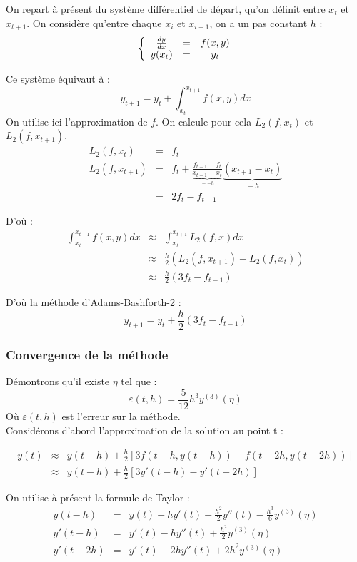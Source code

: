 \bigskip
On repart à présent du système différentiel de départ, qu'on définit entre $x_t$ et $x_{t+1}$. On considère qu'entre chaque $x_i$ et $x_{i+1}$, on a un pas constant $h$ :
\[ \left\{ \begin{array}{c c c}
	\frac{dy}{dx} &=& f(x,y) \\
		y(x_t)&=&y_t
\end{array}\right.\]

Ce système équivaut à : 
\[y_{t+1}=y_t + \int_{x_t}^{x_{t+1}} f(x,y) dx\]
On utilise ici l'approximation de $f$. On calcule pour cela $L_2(f,x_t)$ et $L_2(f,x_{t+1})$.
\begin{eqnarray*}
	L_2(f,x_t)&=&f_t\\
	L_2(f,x_{t+1})&=&f_t + \frac{f_{t-1}-f_t}{\underbrace{x_{t-1}-x_t}_{=-h}}\underbrace{(x_{t+1}-x_t)}_{=h}\\
			&=&2f_t - f_{t-1} 
\end{eqnarray*}

D'où :
\begin{eqnarray*}
	\int_{x_t}^{x_{t+1}} f(x,y)dx &\approx& \int_{x_t}^{x_{t+1}} L_2(f,x) dx \\
				      &\approx& \frac{h}{2}(L_2(f,x_{t+1}) + L_2(f,x_t))\\
			       	      &\approx& \frac{h}{2}(3f_t - f_{t-1})
\end{eqnarray*}

D'où la méthode d'Adams-Bashforth-2 :
\[y_{t+1}=y_t + \frac{h}{2}(3f_t - f_{t-1})\]

\subsubsection{Convergence de la méthode}
Démontrons qu'il existe $\eta$ tel que : 
\[\varepsilon(t,h)=\frac{5}{12} h^3 y^{(3)}(\eta)\]
Où $\varepsilon(t,h)$ est l'erreur sur la méthode.\\
Considérons d'abord l'approximation de la solution au point t :

\begin{eqnarray*}
	y(t) &\approx& y(t-h) + \frac{h}{2} [3f(t-h,y(t-h)) - f(t-2h,y(t-2h))] \\
	     &\approx& y(t-h) + \frac{h}{2} [3y'(t-h) - y'(t-2h)]
\end{eqnarray*}

On utilise à présent la formule de Taylor :
\begin{eqnarray*}
	y(t-h)&=&y(t)-hy'(t)+\frac{h^2}{2}y''(t)-\frac{h^3}{6}y^{(3)}(\eta)\\
       y'(t-h)&=&y'(t)-hy''(t)+\frac{h^2}{2}y^{(3)}(\eta)\\
      y'(t-2h)&=&y'(t)-2hy''(t)+2h^2y^{(3)}(\eta)
\end{eqnarray*}

